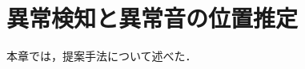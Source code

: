 \documentclass[../main]{subfiles}
\begin{document}
\section{異常検知と異常音の位置推定}
\label{sec:pmethod_conclusion}

本章では，提案手法について述べた．
\end{document}
